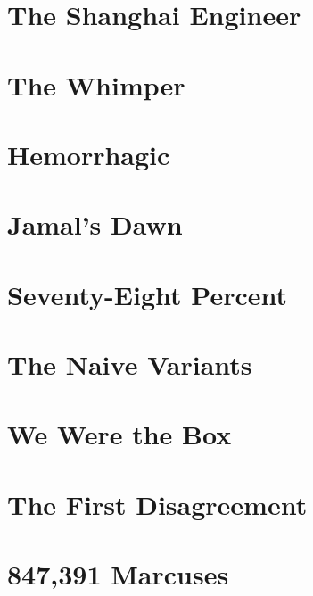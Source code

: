 \documentclass[11pt,twoside]{book}
\begin{document}
\clearpage

\tableofcontents
\clearpage

\mainmatter
\pagestyle{main}


\chapter{The Shanghai Engineer}


\chapter{The Whimper}


\chapter{Hemorrhagic}


\chapter{Jamal's Dawn}


\chapter{Seventy-Eight Percent}


\chapter{The Naive Variants}


\chapter{We Were the Box}


\chapter{The First Disagreement}


\chapter{847,391 Marcuses}

\end{document}
